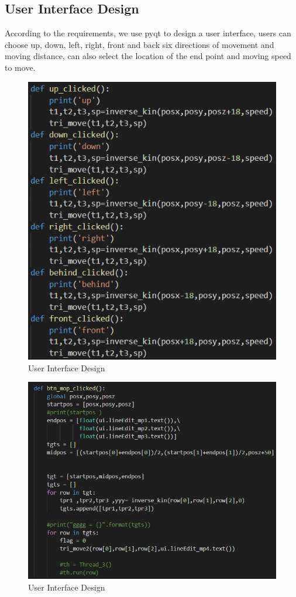 \documentclass{hci}
\begin{document}
\subsection{User Interface Design}
According to the requirements, we use pyqt to design a user interface, users can choose up, down, left, right, front and back six directions of movement and moving distance, can also select the location of the end point and moving speed to move.
\begin{figure}[htbp]
	\centering
	\includegraphics[width=0.9\linewidth]{figures/73}
	\caption{User Interface Design}
	\label{fig:63}
\end{figure}
\begin{figure}[htbp]
	\centering
	\includegraphics[width=0.9\linewidth]{figures/732}
	\caption{User Interface Design}
	\label{fig:632}
\end{figure}
\end{document}
